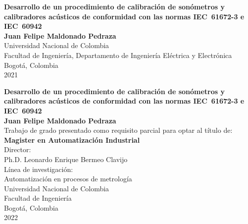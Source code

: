 \begin{center}
	\capstartfalse  %
	\begin{figure}
		\centering
	\end{figure}
	\thispagestyle{empty}
	\huge\textbf{Desarrollo de un procedimiento de calibración de sonómetros
				y calibradores acústicos de conformidad con las normas \mbox{IEC 61672-3} e \mbox{IEC 60942}}\\[4.0cm]
	\Large\textbf{Juan Felipe Maldonado Pedraza}\\[4.0cm]
	\small Universidad Nacional de Colombia\\
	Facultad de Ingeniería, Departamento de Ingeniería Eléctrica y Electrónica\\
	Bogotá, Colombia\\
	2021
\end{center}

\newpage{\pagestyle{empty}\cleardoublepage}
\newpage

\begin{center}
	\thispagestyle{empty}
	\huge\textbf{Desarrollo de un procedimiento  de calibración de sonómetros
				y calibradores acústicos de conformidad con las normas \mbox{IEC 61672-3} e \mbox{IEC 60942}}\\[3.0cm]
	\Large\textbf{Juan Felipe Maldonado Pedraza}\\[3.0cm]
	\small Trabajo de grado presentado como requisito parcial para optar al título de:\\
	\textbf{Magister en Automatización Industrial}\\[2.0cm]
	Director:\\
	Ph.D. Leonardo Enrique Bermeo Clavijo\\[2.0cm]
	Línea de investigación:\\
	Automatización en procesos de metrología\\
	Universidad Nacional de Colombia\\
	Facultad de Ingeniería\\
	Bogotá, Colombia\\
	2022
\end{center}

